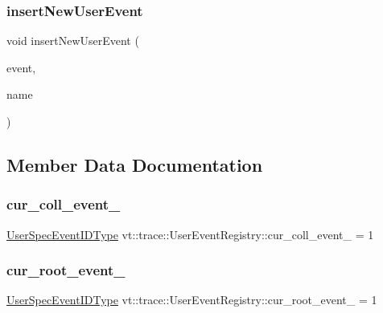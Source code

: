 \subsubsection{\texorpdfstring{insert\+New\+User\+Event}{insertNewUserEvent}}
{\footnotesize\ttfamily void insert\+New\+User\+Event (\begin{DoxyParamCaption}\item[{\hyperlink{namespacevt_1_1trace_a5908920d051c144c89f17c69ed262350}{User\+Event\+I\+D\+Type}}]{event,  }\item[{std\+::string const \&}]{name }\end{DoxyParamCaption})\hspace{0.3cm}{\ttfamily [friend]}}



\subsection{Member Data Documentation}
\mbox{\label{structvt_1_1trace_1_1_user_event_registry_a5aeb079091c716db207203ddea26b39d}} 
\subsubsection{\texorpdfstring{cur\+\_\+coll\+\_\+event\+\_\+}{cur\_coll\_event\_}}
{\footnotesize\ttfamily \hyperlink{namespacevt_1_1trace_a70c43e0e1596eea236912d4197d3120a}{User\+Spec\+Event\+I\+D\+Type} vt\+::trace\+::\+User\+Event\+Registry\+::cur\+\_\+coll\+\_\+event\+\_\+ = 1\hspace{0.3cm}{\ttfamily [private]}}

\mbox{\label{structvt_1_1trace_1_1_user_event_registry_adbebc33d6c64eaee5f6c59be8482b833}} 
\subsubsection{\texorpdfstring{cur\+\_\+root\+\_\+event\+\_\+}{cur\_root\_event\_}}
{\footnotesize\ttfamily \hyperlink{namespacevt_1_1trace_a70c43e0e1596eea236912d4197d3120a}{User\+Spec\+Event\+I\+D\+Type} vt\+::trace\+::\+User\+Event\+Registry\+::cur\+\_\+root\+\_\+event\+\_\+ = 1\hspace{0.3cm}{\ttfamily [private]}}

